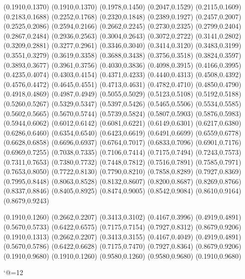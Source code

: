 \PST@Dashed(0.1910,0.1370)
(0.1910,0.1370)
(0.1978,0.1450)
(0.2047,0.1529)
(0.2115,0.1609)
(0.2183,0.1688)
(0.2252,0.1768)
(0.2320,0.1848)
(0.2389,0.1927)
(0.2457,0.2007)
(0.2525,0.2086)
(0.2594,0.2166)
(0.2662,0.2245)
(0.2730,0.2325)
(0.2799,0.2404)
(0.2867,0.2484)
(0.2936,0.2563)
(0.3004,0.2643)
(0.3072,0.2722)
(0.3141,0.2802)
(0.3209,0.2881)
(0.3277,0.2961)
(0.3346,0.3040)
(0.3414,0.3120)
(0.3483,0.3199)
(0.3551,0.3279)
(0.3619,0.3358)
(0.3688,0.3438)
(0.3756,0.3518)
(0.3824,0.3597)
(0.3893,0.3677)
(0.3961,0.3756)
(0.4030,0.3836)
(0.4098,0.3915)
(0.4166,0.3995)
(0.4235,0.4074)
(0.4303,0.4154)
(0.4371,0.4233)
(0.4440,0.4313)
(0.4508,0.4392)
(0.4576,0.4472)
(0.4645,0.4551)
(0.4713,0.4631)
(0.4782,0.4710)
(0.4850,0.4790)
(0.4918,0.4869)
(0.4987,0.4949)
(0.5055,0.5029)
(0.5123,0.5108)
(0.5192,0.5188)
(0.5260,0.5267)
(0.5329,0.5347)
(0.5397,0.5426)
(0.5465,0.5506)
(0.5534,0.5585)
(0.5602,0.5665)
(0.5670,0.5744)
(0.5739,0.5824)
(0.5807,0.5903)
(0.5876,0.5983)
(0.5944,0.6062)
(0.6012,0.6142)
(0.6081,0.6221)
(0.6149,0.6301)
(0.6217,0.6380)
(0.6286,0.6460)
(0.6354,0.6540)
(0.6423,0.6619)
(0.6491,0.6699)
(0.6559,0.6778)
(0.6628,0.6858)
(0.6696,0.6937)
(0.6764,0.7017)
(0.6833,0.7096)
(0.6901,0.7176)
(0.6969,0.7255)
(0.7038,0.7335)
(0.7106,0.7414)
(0.7175,0.7494)
(0.7243,0.7573)
(0.7311,0.7653)
(0.7380,0.7732)
(0.7448,0.7812)
(0.7516,0.7891)
(0.7585,0.7971)
(0.7653,0.8050)
(0.7722,0.8130)
(0.7790,0.8210)
(0.7858,0.8289)
(0.7927,0.8369)
(0.7995,0.8448)
(0.8063,0.8528)
(0.8132,0.8607)
(0.8200,0.8687)
(0.8269,0.8766)
(0.8337,0.8846)
(0.8405,0.8925)
(0.8474,0.9005)
(0.8542,0.9084)
(0.8610,0.9164)
(0.8679,0.9243)

\PST@Fillcircle(0.1910,0.1260)
\PST@Fillcircle(0.2662,0.2207)
\PST@Fillcircle(0.3413,0.3102)
\PST@Fillcircle(0.4167,0.3996)
\PST@Fillcircle(0.4919,0.4891)
\PST@Fillcircle(0.5670,0.5733)
\PST@Fillcircle(0.6422,0.6575)
\PST@Fillcircle(0.7175,0.7154)
\PST@Fillcircle(0.7927,0.8312)
\PST@Fillcircle(0.8679,0.9206)
\PST@Fillsquare(0.1910,0.1313)
\PST@Fillsquare(0.2662,0.2207)
\PST@Fillsquare(0.3413,0.3155)
\PST@Fillsquare(0.4167,0.4049)
\PST@Fillsquare(0.4919,0.4891)
\PST@Fillsquare(0.5670,0.5786)
\PST@Fillsquare(0.6422,0.6628)
\PST@Fillsquare(0.7175,0.7470)
\PST@Fillsquare(0.7927,0.8364)
\PST@Fillsquare(0.8679,0.9206)
\PST@Border(0.1910,0.9680)
(0.1910,0.1260)
(0.9580,0.1260)
(0.9580,0.9680)
(0.1910,0.9680)

\catcode`@=12
\fi
\endpspicture